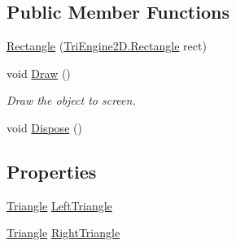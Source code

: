 \subsection*{Public Member Functions}
\begin{DoxyCompactItemize}
\item 
\hyperlink{class_tri_devs_1_1_tri_engine2_d_1_1_graphics_1_1_rectangle_af4ef9a87cfb8fccd625544ab4a67b06e}{Rectangle} (\hyperlink{struct_tri_devs_1_1_tri_engine2_d_1_1_rectangle}{Tri\-Engine2\-D.\-Rectangle} rect)
\item 
void \hyperlink{class_tri_devs_1_1_tri_engine2_d_1_1_graphics_1_1_rectangle_a771fe339faa53aa3de4e8041fc66ebd7}{Draw} ()
\begin{DoxyCompactList}\small\item\em Draw the object to screen. \end{DoxyCompactList}\item 
void \hyperlink{class_tri_devs_1_1_tri_engine2_d_1_1_graphics_1_1_rectangle_a683be8c47c770480ec66a9735e30a857}{Dispose} ()
\end{DoxyCompactItemize}
\subsection*{Properties}
\begin{DoxyCompactItemize}
\item 
\hyperlink{class_tri_devs_1_1_tri_engine2_d_1_1_graphics_1_1_triangle}{Triangle} \hyperlink{class_tri_devs_1_1_tri_engine2_d_1_1_graphics_1_1_rectangle_aa100178178cdaebc6eafeec2c19aafe9}{Left\-Triangle}
\item 
\hyperlink{class_tri_devs_1_1_tri_engine2_d_1_1_graphics_1_1_triangle}{Triangle} \hyperlink{class_tri_devs_1_1_tri_engine2_d_1_1_graphics_1_1_rectangle_a89366e6a5a27c27770e75d9c2e5f095d}{Right\-Triangle}
\end{DoxyCompactItemize}


